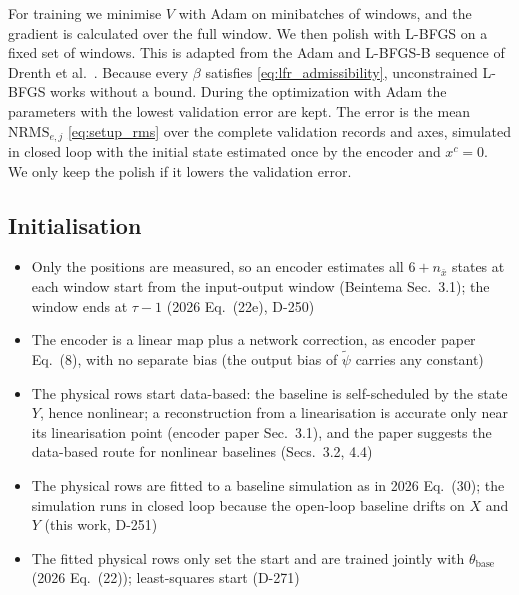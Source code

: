 For training we minimise $V$ with Adam on minibatches of windows, and 
the gradient is calculated over the full window.
We then polish with L-BFGS on a fixed set of windows.
This is adapted from the Adam and L-BFGS-B sequence of Drenth
et al.~\cite[Sec.~5.1]{drenth2025lpvlfr}.
Because every $\beta$ satisfies \eqref{eq:lfr_admissibility}, 
unconstrained L-BFGS works without a bound.
During the optimization with Adam the parameters with the lowest validation 
error are kept.
The error is the mean $\mathrm{NRMS}_{e,j}$ \eqref{eq:setup_rms} over the
complete validation records and axes,
simulated in closed loop with the initial state estimated
once by the encoder and $x^c=0$.
We only keep the polish if it lowers the validation error.

\subsection{Initialisation}\label{sec:aug_encoder}
\ifdraft
\begin{itemize}
\item Only the positions are measured, so an encoder estimates all $6+n_{\bar x}$ states at each window start from the input-output window (Beintema Sec.~3.1); the window ends at $\tau-1$ (2026 Eq.~(22e), D-250)
\item The encoder is a linear map plus a network correction, as encoder paper Eq.~(8), with no separate bias (the output bias of $\tilde\psi$ carries any constant)
\item The physical rows start data-based: the baseline is self-scheduled by the state $Y$, hence nonlinear; a reconstruction from a linearisation is accurate only near its linearisation point (encoder paper Sec.~3.1), and the paper suggests the data-based route for nonlinear baselines (Secs.~3.2, 4.4)
\item The physical rows are fitted to a baseline simulation as in 2026 Eq.~(30); the simulation runs in closed loop because the open-loop baseline drifts on $X$ and $Y$ (this work, D-251)
\item The fitted physical rows only set the start and are trained jointly with $\theta_{\mathrm{base}}$ (2026 Eq.~(22)); least-squares start (D-271)
\end{itemize}
\fi

